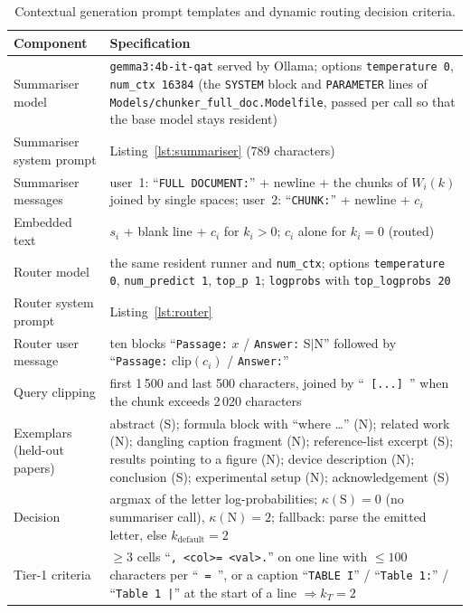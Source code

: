 \documentclass[pdflatex,sn-mathphys-num]{sn-jnl}
\theoremstyle{thmstyleone}%
\theoremstyle{thmstylethree}%
\begin{document}
\begin{table}[htbp]
\caption{Contextual generation prompt templates and dynamic routing decision criteria.}\label{tab:prompts}
\begin{tabular}{@{}p{3.6cm}p{9.2cm}@{}}
\toprule
Component & Specification \\
\midrule
Summariser model & \texttt{gemma3:4b-it-qat} served by Ollama; options \texttt{temperature 0}, \texttt{num\_ctx 16384} (the \texttt{SYSTEM} block and \texttt{PARAMETER} lines of \texttt{Models/chunker\_full\_doc.Modelfile}, passed per call so that the base model stays resident) \\
Summariser system prompt & Listing~\ref{lst:summariser} (789 characters) \\
Summariser messages & user~1: ``\texttt{FULL DOCUMENT:}'' + newline + the chunks of $W_i(k)$ joined by single spaces; user~2: ``\texttt{CHUNK:}'' + newline + $c_i$ \\
Embedded text & $s_i$ + blank line + $c_i$ for $k_i>0$; $c_i$ alone for $k_i=0$ (routed) \\
Router model & the same resident runner and \texttt{num\_ctx}; options \texttt{temperature 0}, \texttt{num\_predict 1}, \texttt{top\_p 1}; \texttt{logprobs} with \texttt{top\_logprobs 20} \\
Router system prompt & Listing~\ref{lst:router} \\
Router user message & ten blocks ``\texttt{Passage:} $x$ / \texttt{Answer:} S$\mid$N'' followed by ``\texttt{Passage:} $\mathrm{clip}(c_i)$ / \texttt{Answer:}'' \\
Query clipping & first 1\,500 and last 500 characters, joined by ``\texttt{ [...] }'' when the chunk exceeds 2\,020 characters \\
Exemplars (held-out papers) & abstract (S); formula block with ``where \ldots'' (N); related work (N); dangling caption fragment (N); reference-list excerpt (S); results pointing to a figure (N); device description (N); conclusion (S); experimental setup (N); acknowledgement (S) \\
Decision & argmax of the letter log-probabilities; $\kappa(\mathrm S)=0$ (no summariser call), $\kappa(\mathrm N)=2$; fallback: parse the emitted letter, else $k_{\mathrm{default}}=2$ \\
Tier-1 criteria & $\ge 3$ cells ``\texttt{, \textless col\textgreater = \textless val\textgreater.}'' on one line with $\le 100$ characters per ``\texttt{ = }'', or a caption ``\texttt{TABLE I}'' / ``\texttt{Table 1:}'' / ``\texttt{Table 1 |}'' at the start of a line $\Rightarrow k_T=2$ \\

\end{tabular}
\end{table}
\end{document}
